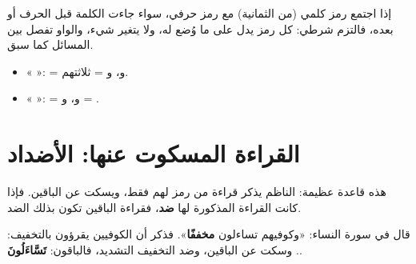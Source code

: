 \maana إذا اجتمع رمز كلمي (من الثمانية) مع رمز حرفي، سواء جاءت الكلمة قبل الحرف أو بعده، فالتزم شرطي: كل رمز يدل على ما وُضع له، ولا يتغير شيء، والواو تفصل بين المسائل كما سبق.

\begin{amthila}
\begin{itemize}
\item « »:  = \IbnKathir{} و\AbuAmr، و = \Asim{} \ila{} ثلاثتهم.
\item « »:  = \Nafi{} و\IbnAmir، و = \Hafs.
\end{itemize}
\end{amthila}

\section{القراءة المسكوت عنها: الأضداد}

\begin{mufradat}
\end{mufradat}

\maana[(الأبيات ٥٧–٥٩)] هذه قاعدة عظيمة: الناظم يذكر قراءة من رمز لهم فقط، ويسكت عن الباقين. فإذا كانت القراءة المذكورة لها \textbf{ضد}، فقراءة الباقين تكون بذلك الضد.

\begin{amthila}[مثال]
قال في سورة النساء: «وكوفيهم تساءلون \textbf{مخففًا}». فذكر أن الكوفيين يقرؤون بالتخفيف:  . وسكت عن الباقين، وضد التخفيف التشديد، فالباقون: \textbf{تَسَّاءَلُونَ}.
\end{amthila}

